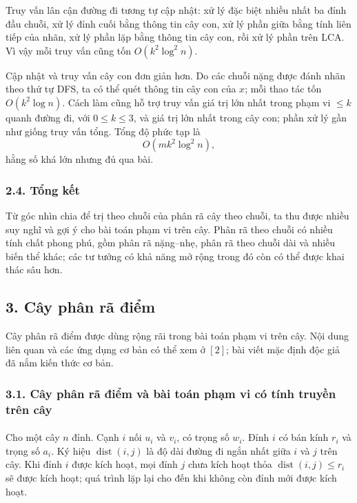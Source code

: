 \documentclass[11pt]{article}
\begin{document}
Truy vấn lân cận đường đi tương tự cập nhật: xử lý đặc biệt nhiều nhất ba đỉnh
đầu chuỗi, xử lý đỉnh cuối bằng thông tin cây con, xử lý phần giữa bằng tính
liên tiếp của nhãn, xử lý phần lặp bằng thông tin cây con, rồi xử lý phần trên
LCA. Vì vậy mỗi truy vấn cũng tốn \(O(k^2\log^2 n)\).

Cập nhật và truy vấn cây con đơn giản hơn. Do các chuỗi nặng được đánh nhãn
theo thứ tự DFS, ta có thể quét thông tin cây con của \(x\); mỗi thao tác tốn
\(O(k^2\log n)\). Cách làm cũng hỗ trợ truy vấn giá trị lớn nhất trong phạm vi
\(\le k\) quanh đường đi, với \(0\le k\le 3\), và giá trị lớn nhất trong cây
con; phần xử lý gần như giống truy vấn tổng. Tổng độ phức tạp là
\[
  O(mk^2\log^2 n),
\]
hằng số khá lớn nhưng đủ qua bài.

\subsubsection*{2.4. Tổng kết}

Từ góc nhìn chia để trị theo chuỗi của phân rã cây theo chuỗi, ta thu được
nhiều suy nghĩ và gợi ý cho bài toán phạm vi trên cây. Phân rã theo chuỗi có
nhiều tính chất phong phú, gồm phân rã nặng--nhẹ, phân rã theo chuỗi dài và
nhiều biến thể khác; các tư tưởng có khả năng mở rộng trong đó còn có thể được
khai thác sâu hơn.

\subsection*{3. Cây phân rã điểm}

Cây phân rã điểm được dùng rộng rãi trong bài toán phạm vi trên cây. Nội dung
liên quan và các ứng dụng cơ bản có thể xem ở \([2]\); bài viết mặc định độc
giả đã nắm kiến thức cơ bản.

\subsubsection*{3.1. Cây phân rã điểm và bài toán phạm vi có tính truyền trên cây}

\paragraph{}
Cho một cây \(n\) đỉnh. Cạnh \(i\) nối \(u_i\) và \(v_i\), có trọng số \(w_i\).
Đỉnh \(i\) có bán kính \(r_i\) và trọng số \(a_i\). Ký hiệu
\(\operatorname{dist}(i,j)\) là độ dài đường đi ngắn nhất giữa \(i\) và \(j\)
trên cây. Khi đỉnh \(i\) được kích hoạt, mọi đỉnh \(j\) chưa kích hoạt thỏa
\(\operatorname{dist}(i,j)\le r_i\) sẽ được kích hoạt; quá trình lặp lại cho
đến khi không còn đỉnh mới được kích hoạt.
\end{document}
